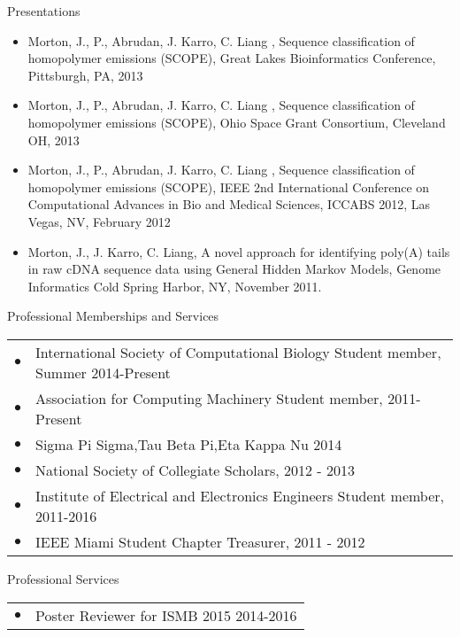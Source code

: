 \documentclass{resume} %
\begin{document}
\begin{rSection}{Presentations}
\begin{itemize}
    \item   Morton, J., P., Abrudan, J. Karro, C. Liang , Sequence classification of homopolymer emissions
                (SCOPE), Great Lakes Bioinformatics Conference, Pittsburgh, PA, 2013
    \item   Morton, J., P., Abrudan, J. Karro, C. Liang , Sequence classification of homopolymer emissions
                (SCOPE), Ohio Space Grant Consortium, Cleveland OH, 2013
    \item   Morton, J., P., Abrudan, J. Karro, C. Liang , Sequence classification of homopolymer emissions
                (SCOPE), IEEE 2nd International Conference on Computational Advances in Bio and
                Medical Sciences, ICCABS 2012, Las Vegas, NV, February 2012
    \item   Morton, J., J. Karro, C. Liang, A novel approach for identifying poly(A) tails in
                raw cDNA sequence data using General Hidden Markov Models, Genome Informatics
                Cold Spring Harbor, NY, November 2011.
  \end{itemize}
\end{rSection}

\begin{rSection}{Professional Memberships and Services}
  \begin{tabular}{ll}
    $\bullet$ & International Society of Computational Biology Student member, Summer  2014-Present\\
    $\bullet$ & Association for Computing Machinery Student member, 2011-Present \\
    $\bullet$ & Sigma Pi Sigma,Tau Beta Pi,Eta Kappa Nu 2014 \\
    $\bullet$ & National Society of Collegiate Scholars, 2012 - 2013\\
    $\bullet$ & Institute of Electrical and Electronics Engineers Student member, 2011-2016 \\
    $\bullet$ & IEEE Miami Student Chapter Treasurer, 2011 - 2012\\
  \end{tabular}
\end{rSection}

\begin{rSection}{Professional Services}
  \begin{tabular}{ll}
    $\bullet$ & Poster Reviewer for ISMB 2015  2014-2016\\[10 mm]
  \end{tabular}
\end{rSection}
\end{document}
